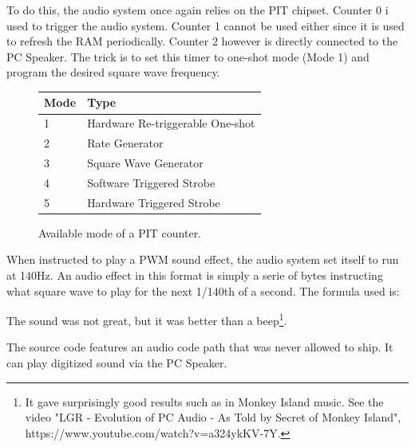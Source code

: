 To do this, the audio system once again relies on the PIT chipset. Counter 0 i used to trigger the audio system. Counter 1 cannot be used either since it is used to refresh the RAM periodically. Counter 2 however is directly connected to the PC Speaker. The trick is to set this timer to one-shot mode (Mode 1) and program the desired square wave frequency. \\
\par
\begin{figure}[H]
\centering
\begin{tabularx}{\textwidth}{ X X  }
  \toprule
  \textbf{Mode} & \textbf{Type} \\ \bottomrule
1 & Hardware Re-triggerable One-shot\\
2 & Rate Generator\\
3 & Square Wave Generator\\
4 & Software Triggered Strobe\\
5 & Hardware Triggered Strobe\\
\bottomrule
\end{tabularx}
\caption{Available mode of a PIT counter.}
\end{figure}
\par 
When instructed to play a PWM sound effect, the audio system set itself to run at 140Hz. An audio effect in this format is simply a serie of bytes instructing what square wave to play for the next 1/140th of a second. The formula used is:
\par 
\begin{minipage}{\textwidth}

\end{minipage}
\par
The sound was not great, but it was better than a beep\footnote{It gave surprisingly good results such as in Monkey Island music. See the video "LGR - Evolution of PC Audio - As Told by Secret of Monkey Island", https://www.youtube.com/watch?v=a324ykKV-7Y.}.\\
\par

 The source code features an audio code path that was never allowed to ship. It can play digitized sound via the PC Speaker.\\

